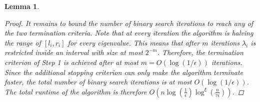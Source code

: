 \documentclass{article}
\newcommand{\lpar}{\left(}
\newcommand{\rpar}{\right)}
\newtheorem{lemma}{Lemma}[section]
\newcommand{\cfmm}{\xi}
\begin{document}
\begin{lemma}
\begin{proof}
        It remains to bound the number of binary search iterations to reach any of the two termination criteria. Note that at every iteration the algorithm is halving the range of $[l_i,r_i]$ for every eigenvalue. This means that after $m$ iterations $\lambda_i$ is restricted inside an interval with size at most $2^{-m}$. Therefore, the termination criterion of Step 1 is achieved after at most $m=O(\log(1/\epsilon))$ iterations. Since the additional stopping criterion can only make the algorithm terminate faster, the total number of binary search iterations is at most $O(\log(1/\epsilon))$.
        The total runtime of the algorithm is therefore $O\lpar
            n\log(\tfrac{1}{\epsilon})\log^{\cfmm}(\tfrac{n}{\tau\epsilon})
        \rpar$.
    \end{proof}
\end{lemma}
\end{document}
